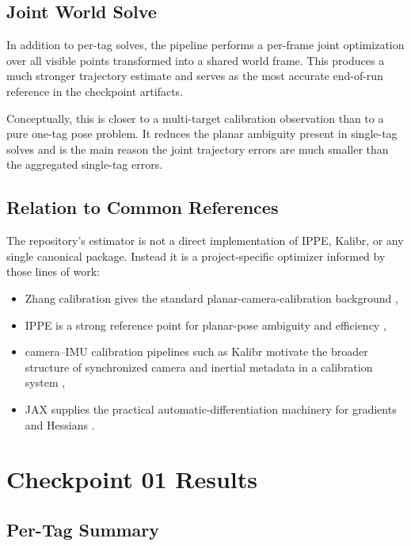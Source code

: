 \documentclass[11pt,a4paper]{article}
\begin{document}
\subsection{Joint World Solve}

In addition to per-tag solves, the pipeline performs a per-frame joint optimization over all visible points transformed into a shared world frame.
This produces a much stronger trajectory estimate and serves as the most accurate end-of-run reference in the checkpoint artifacts.

Conceptually, this is closer to a multi-target calibration observation than to a pure one-tag pose problem.
It reduces the planar ambiguity present in single-tag solves and is the main reason the joint trajectory errors are much smaller than the aggregated single-tag errors.

\subsection{Relation to Common References}

The repository's estimator is not a direct implementation of IPPE, Kalibr, or any single canonical package.
Instead it is a project-specific optimizer informed by those lines of work:

\begin{itemize}
  \item Zhang calibration gives the standard planar-camera-calibration background \citep{zhang2000flexible},
  \item IPPE is a strong reference point for planar-pose ambiguity and efficiency \citep{collins2014ippe},
  \item camera--IMU calibration pipelines such as Kalibr motivate the broader structure of synchronized camera and inertial metadata in a calibration system \citep{furgale2013unified,rehder2017camimu},
  \item JAX supplies the practical automatic-differentiation machinery for gradients and Hessians \citep{bradbury2018jax}.
\end{itemize}

\section{Checkpoint 01 Results}

\subsection{Per-Tag Summary}
\end{document}
